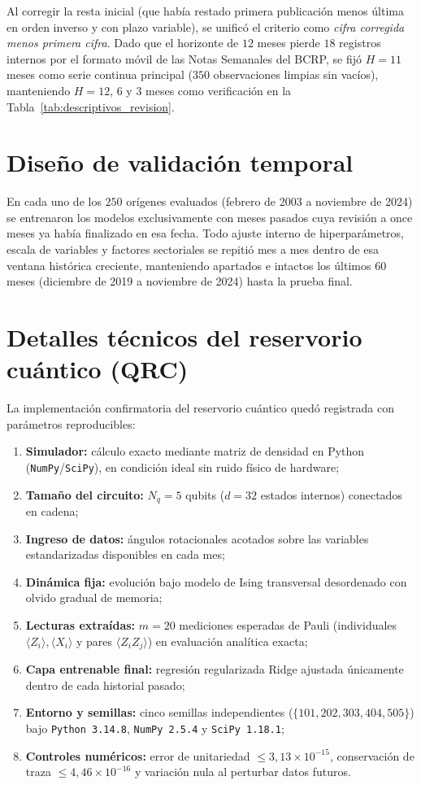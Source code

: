 Al corregir la resta inicial (que había restado primera publicación menos última en orden inverso y con plazo variable), se unificó el criterio como \emph{cifra corregida menos primera cifra}. Dado que el horizonte de \(12\) meses pierde \(18\) registros internos por el formato móvil de las Notas Semanales del BCRP, se fijó \(H=11\) meses como serie continua principal (\(350\) observaciones limpias sin vacíos), manteniendo \(H=12\), \(6\) y \(3\) meses como verificación en la Tabla~\ref{tab:descriptivos_revision}.

\section{Diseño de validación temporal}
\label{app:validacion}

En cada uno de los \(250\) orígenes evaluados (febrero de 2003 a noviembre de 2024) se entrenaron los modelos exclusivamente con meses pasados cuya revisión a once meses ya había finalizado en esa fecha. Todo ajuste interno de hiperparámetros, escala de variables y factores sectoriales se repitió mes a mes dentro de esa ventana histórica creciente, manteniendo apartados e intactos los últimos \(60\) meses (diciembre de 2019 a noviembre de 2024) hasta la prueba final.

\section{Detalles técnicos del reservorio cuántico (QRC)}
\label{app:qrc}

La implementación confirmatoria del reservorio cuántico quedó registrada con parámetros reproducibles:
\begin{enumerate}
	\item \textbf{Simulador:} cálculo exacto mediante matriz de densidad en Python (\texttt{NumPy}/\texttt{SciPy}), en condición ideal sin ruido físico de hardware;
	\item \textbf{Tamaño del circuito:} \(N_q=5\) qubits (\(d=32\) estados internos) conectados en cadena;
	\item \textbf{Ingreso de datos:} ángulos rotacionales acotados sobre las variables estandarizadas disponibles en cada mes;
	\item \textbf{Dinámica fija:} evolución bajo modelo de Ising transversal desordenado con olvido gradual de memoria;
	\item \textbf{Lecturas extraídas:} \(m=20\) mediciones esperadas de Pauli (individuales \(\langle Z_i\rangle, \langle X_i\rangle\) y pares \(\langle Z_i Z_j\rangle\)) en evaluación analítica exacta;
	\item \textbf{Capa entrenable final:} regresión regularizada Ridge ajustada únicamente dentro de cada historial pasado;
	\item \textbf{Entorno y semillas:} cinco semillas independientes (\(\{101, 202, 303, 404, 505\}\)) bajo \texttt{Python 3.14.8}, \texttt{NumPy 2.5.4} y \texttt{SciPy 1.18.1};
	\item \textbf{Controles numéricos:} error de unitariedad \(\le 3{,}13\times 10^{-15}\), conservación de traza \(\le 4{,}46\times 10^{-16}\) y variación nula al perturbar datos futuros.
\end{enumerate}

